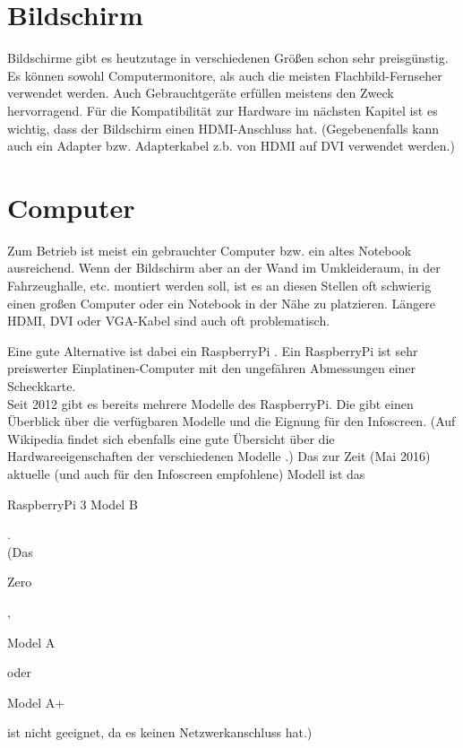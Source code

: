 \section{Bildschirm}
\label{sec:bildschirm}
Bildschirme gibt es heutzutage in verschiedenen Größen schon sehr preisgünstig.
Es können sowohl Computermonitore, als auch die meisten Flachbild-Fernseher verwendet werden.
Auch Gebrauchtgeräte erfüllen meistens den Zweck hervorragend.
Für die Kompatibilität zur Hardware im nächsten Kapitel ist es wichtig, dass der Bildschirm einen HDMI-Anschluss \cite{hdmi} hat.
(Gegebenenfalls kann auch ein Adapter bzw. Adapterkabel z.b. von HDMI auf DVI verwendet werden.)

\section{Computer}
\label{sec:rpi}
Zum Betrieb ist meist ein gebrauchter Computer bzw. ein altes Notebook ausreichend.
Wenn der Bildschirm aber an der Wand im Umkleideraum, in der Fahrzeughalle, etc. montiert werden soll,
ist es an diesen Stellen oft schwierig einen großen Computer oder ein Notebook in der Nähe zu platzieren.
Längere HDMI, DVI oder VGA-Kabel sind auch oft problematisch.

Eine gute Alternative ist dabei ein RaspberryPi \cite{rpi}. Ein RaspberryPi ist sehr preiswerter Einplatinen-Computer mit den ungefähren Abmessungen einer Scheckkarte.\\
Seit 2012 gibt es bereits mehrere Modelle des RaspberryPi. Die  gibt einen Überblick über die verfügbaren Modelle und die Eignung für den Infoscreen. 
(Auf Wikipedia findet sich ebenfalls eine gute Übersicht über die Hardwareeigenschaften der verschiedenen Modelle \cite{wikirpi}.)
Das zur Zeit (Mai 2016) aktuelle (und auch für den Infoscreen empfohlene) Modell ist das \begin{em}RaspberryPi 3 Model B\end{em}.\\
(Das \begin{em}Zero\end{em}, \begin{em}Model A\end{em} oder \begin{em}Model A+\end{em} ist nicht geeignet, da es keinen Netzwerkanschluss hat.)

